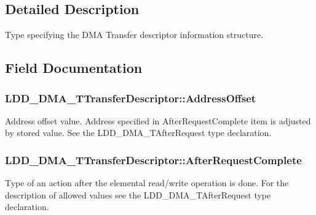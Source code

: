 \subsection{Detailed Description}
Type specifying the D\+M\+A Transfer descriptor information structure. 

\subsection{Field Documentation}
\hypertarget{struct_l_d_d___d_m_a___t_transfer_descriptor_aff47307126179fdf6b241ca1b7371256}{}
\subsubsection[{Address\+Offset}]{ L\+D\+D\+\_\+\+D\+M\+A\+\_\+\+T\+Transfer\+Descriptor\+::\+Address\+Offset}\label{struct_l_d_d___d_m_a___t_transfer_descriptor_aff47307126179fdf6b241ca1b7371256}
Address offset value. Address specified in After\+Request\+Complete item is adjusted by stored value. See the L\+D\+D\+\_\+\+D\+M\+A\+\_\+\+T\+After\+Request type declaration. \hypertarget{struct_l_d_d___d_m_a___t_transfer_descriptor_aef9bdbecdd4c1e3e0072105bc194a63f}{}
\subsubsection[{After\+Request\+Complete}]{ L\+D\+D\+\_\+\+D\+M\+A\+\_\+\+T\+Transfer\+Descriptor\+::\+After\+Request\+Complete}\label{struct_l_d_d___d_m_a___t_transfer_descriptor_aef9bdbecdd4c1e3e0072105bc194a63f}
Type of an action after the elemental read/write operation is done. For the description of allowed values see the L\+D\+D\+\_\+\+D\+M\+A\+\_\+\+T\+After\+Request type declaration. \hypertarget{struct_l_d_d___d_m_a___t_transfer_descriptor_ad6046f40169d2ea20061906342615380}{}
